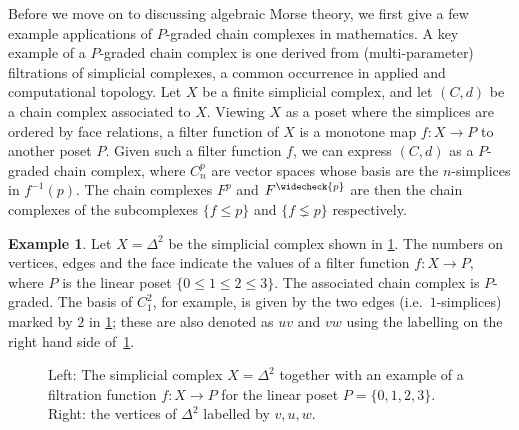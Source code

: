 \documentclass[11pt, table, nothms]{amsart}
\theoremstyle{definition}
\newtheorem{example}[theorem]{Example}
\newcommand{\C}{C}
\newcommand{\vp}{\widecheck{p}}
\newcommand{\fibre}[2]{{#1}^{-1} \left(  #2 \right)}
\begin{document}
{Before we move on to discussing algebraic Morse theory, we first give a few example applications of $P$-graded chain complexes in mathematics. A key example of a $P$-graded chain complex is one derived from (multi-parameter) filtrations of simplicial complexes, a common occurrence in applied and computational topology.  
Let $X$ be a finite simplicial complex, and let $(C,d)$ be a chain complex associated to $X$. 
Viewing $X$ as a poset where the simplices are ordered by face relations, a filter function of $X$ is a monotone map $f: X \to P$ to another poset $P$. Given such a filter function $f$, we can express $(C,d)$ as a $P$-graded chain complex, where $\C^p_n$ are vector spaces whose basis are the $n$-simplices in $\fibre{f}{p}$. 
The chain complexes $F^p$ and $F^{\vp}$ are  then the chain complexes of the subcomplexes $\{f \leq p\}$ and $\{f \lneq p\}$ respectively. 

\begin{example} \label{ex:filtration}
Let $X = \Delta^2$ be the simplicial complex shown in \cref{fig:multipar}. The numbers on vertices, edges and the face indicate the values of a filter function $f \colon X \to P$, where $P$ is the linear poset $\{0 \leq  1 \leq 2 \leq 3\}$. 
The associated chain complex is $P$-graded.
The basis of $\C_1^2$, for example, is given by the two edges (i.e.\ $1$-simplices) marked by $2$ in \cref{fig:multipar}; these are also denoted as $uv$ and $vw$ using the labelling on the right hand side of~\cref{fig:multipar}. 
\begin{figure}[ht]
    \centering
{}
    \caption{Left: The simplicial complex $X = \Delta^2$ together with an example of a filtration function $f \colon X \to P$ for the linear poset $P = \{0,1,2,3\}$. Right: the vertices of $\Delta^2$ labelled by $v,u,w$.}
    \label{fig:multipar}
\end{figure}
\end{example}

}
\end{document}
